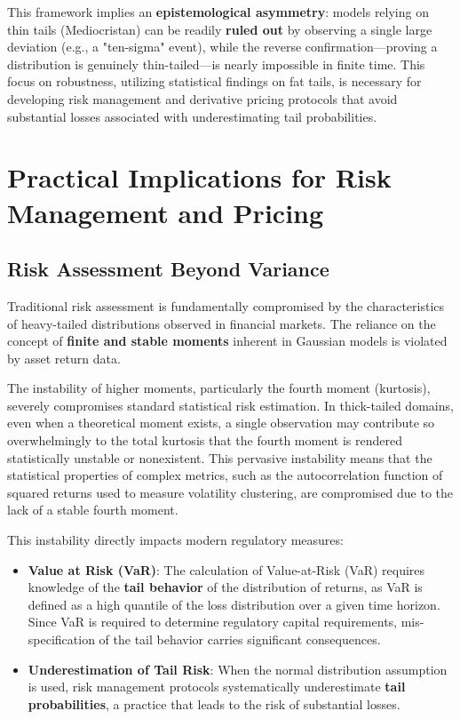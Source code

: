 \documentclass{ieeetj}
\begin{document}
This framework implies an\textbf{ epistemological asymmetry}: models relying on thin tails (Mediocristan) can be readily \textbf{ruled out} by observing a single large deviation (e.g., a "ten-sigma" event), while the reverse confirmation—proving a distribution is genuinely thin-tailed—is nearly impossible in finite time. This focus on robustness, utilizing statistical findings on fat tails, is necessary for developing risk management and derivative pricing protocols that avoid substantial losses associated with underestimating tail probabilities.

\section{Practical Implications for Risk Management and Pricing}

\subsection{Risk Assessment Beyond Variance}

Traditional risk assessment is fundamentally compromised by the characteristics of heavy-tailed distributions observed in financial markets. The reliance on the concept of \textbf{finite and stable moments }inherent in Gaussian models is violated by asset return data.

The instability of higher moments, particularly the fourth moment (kurtosis), severely compromises standard statistical risk estimation. In thick-tailed domains, even when a theoretical moment exists, a single observation may contribute so overwhelmingly to the total kurtosis that the fourth moment is rendered statistically unstable or nonexistent. This pervasive instability means that the statistical properties of complex metrics, such as the autocorrelation function of squared returns used to measure volatility clustering, are compromised due to the lack of a stable fourth moment.

This instability directly impacts modern regulatory measures:
\begin{itemize}
    \item \textbf{Value at Risk (VaR)}: The calculation of Value-at-Risk (VaR) requires knowledge of the \textbf{tail behavior} of the distribution of returns, as VaR is defined as a high quantile of the loss distribution over a given time horizon. Since VaR is required to determine regulatory capital requirements, mis-specification of the tail behavior carries significant consequences.
    \item \textbf{Underestimation of Tail Risk}: When the normal distribution assumption is used, risk management protocols systematically underestimate \textbf{tail probabilities}, a practice that leads to the risk of substantial losses.
\end{itemize}
\end{document}
